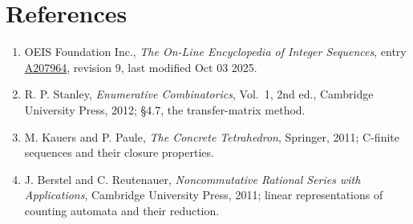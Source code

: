 \documentclass[11pt]{article}
\theoremstyle{definition}
\begin{document}
\section{References}

\begin{enumerate}

\item OEIS Foundation Inc., \emph{The On-Line Encyclopedia of Integer Sequences}, entry \href{https://oeis.org/A207964}{A207964}, revision 9, last modified Oct 03 2025.

\item R. P. Stanley, \emph{Enumerative Combinatorics}, Vol.~1, 2nd ed., Cambridge University Press, 2012; \S4.7, the transfer-matrix method.

\item M. Kauers and P. Paule, \emph{The Concrete Tetrahedron}, Springer, 2011; C-finite sequences and their closure properties.

\item J. Berstel and C. Reutenauer, \emph{Noncommutative Rational Series with Applications}, Cambridge University Press, 2011; linear representations of counting automata and their reduction.

\end{enumerate}
\end{document}
